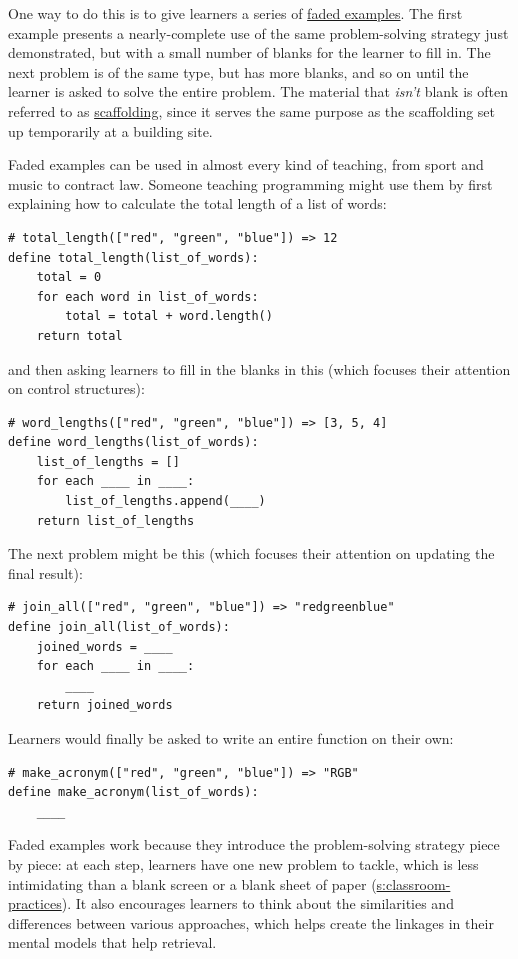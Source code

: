 One way to do this is to give learners a series of
\protect\hyperlink{g:faded-example}{faded examples}. The first example
presents a nearly-complete use of the same problem-solving strategy just
demonstrated, but with a small number of blanks for the learner to fill
in. The next problem is of the same type, but has more blanks, and so on
until the learner is asked to solve the entire problem. The material
that \emph{isn't} blank is often referred to as
\protect\hyperlink{g:scaffolding}{scaffolding}, since it serves the same
purpose as the scaffolding set up temporarily at a building site.

Faded examples can be used in almost every kind of teaching, from sport
and music to contract law. Someone teaching programming might use them
by first explaining how to calculate the total length of a list of
words:

\begin{lstlisting}
# total_length(["red", "green", "blue"]) => 12
define total_length(list_of_words):
    total = 0
    for each word in list_of_words:
        total = total + word.length()
    return total
\end{lstlisting}

and then asking learners to fill in the blanks in this (which focuses
their attention on control structures):

\begin{lstlisting}
# word_lengths(["red", "green", "blue"]) => [3, 5, 4]
define word_lengths(list_of_words):
    list_of_lengths = []
    for each ____ in ____:
        list_of_lengths.append(____)
    return list_of_lengths
\end{lstlisting}

The next problem might be this (which focuses their attention on
updating the final result):

\begin{lstlisting}
# join_all(["red", "green", "blue"]) => "redgreenblue"
define join_all(list_of_words):
    joined_words = ____
    for each ____ in ____:
        ____
    return joined_words
\end{lstlisting}

Learners would finally be asked to write an entire function on their
own:

\begin{lstlisting}
# make_acronym(["red", "green", "blue"]) => "RGB"
define make_acronym(list_of_words):
    ____
\end{lstlisting}

Faded examples work because they introduce the problem-solving strategy
piece by piece: at each step, learners have one new problem to tackle,
which is less intimidating than a blank screen or a blank sheet of paper
(\protect\hyperlink{SECTION}{s:classroom-practices}). It also encourages learners to
think about the similarities and differences between various approaches,
which helps create the linkages in their mental models that help
retrieval.

